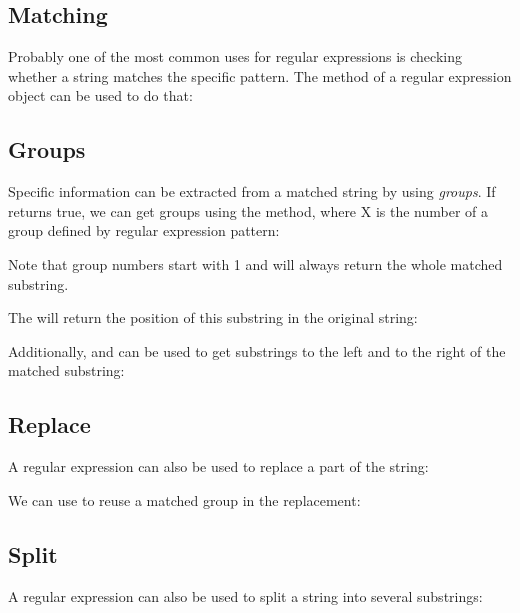 \documentclass{haxe}
\begin{document}
\subsection{Matching}
\label{std-regex-match}

Probably one of the most common uses for regular expressions is checking whether a string matches the specific pattern. The  method of a regular expression object can be used to do that:

\subsection{Groups}
\label{std-regex-groups}

Specific information can be extracted from a matched string by using \emph{groups}. If  returns true, we can get groups using the  method, where X is the number of a group defined by regular expression pattern:


Note that group numbers start with 1 and  will always return the whole matched substring.

The  will return the position of this substring in the original string:


Additionally,  and  can be used to get substrings to the left and to the right of the matched substring:


\subsection{Replace}
\label{std-regex-replace}

A regular expression can also be used to replace a part of the string:


We can use  to reuse a matched group in the replacement:


\subsection{Split}
\label{std-regex-split}

A regular expression can also be used to split a string into several substrings:
\end{document}
